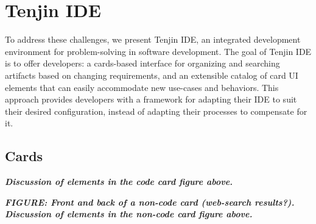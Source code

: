 \documentclass{ppig}
\newcommand{\bold}[1]{\textit{\textbf{\color{aoblue}#1}}}
\begin{document}
\section{Tenjin IDE}
To address these challenges, we present Tenjin IDE, an integrated development environment for problem-solving in software development.
The goal of Tenjin IDE is to offer developers: a cards-based interface for organizing and searching artifacts based on changing requirements, and an extensible catalog of card UI elements that can easily accommodate new use-cases and behaviors.
This approach provides developers with a framework for adapting their IDE to suit their desired configuration, instead of adapting their processes to compensate for it.

\subsection{Cards}
\bold{Discussion of elements in the code card figure above.}

\bold{FIGURE: Front and back of a non-code card (web-search results?).}
\bold{Discussion of elements in the non-code card figure above.}
\end{document}
